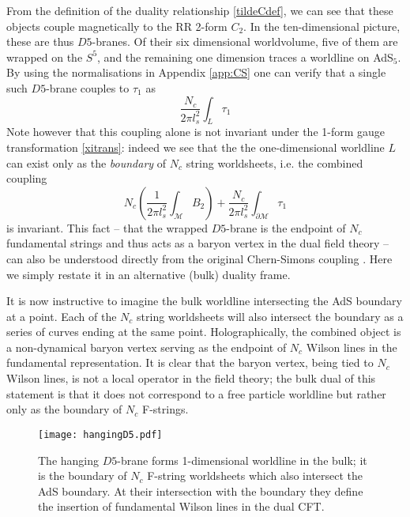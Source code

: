 \documentclass[aps,preprint,nofootinbib,preprintnumbers,eqsecnum,superscriptaddress]{revtex4}
\newcommand\p{\ensuremath{\partial}}
\def\le{\left}
\def\ri{\right}
\newcommand\sM{{\ensuremath{{\mathcal M}}}}
\begin{document}
From the definition of the duality relationship \eqref{tildeCdef}, we can see that these objects couple magnetically to the RR 2-form $C_2$. In the ten-dimensional picture, these are thus $D5$-branes. Of their six dimensional worldvolume, five of them are wrapped on the $S^5$, and the remaining one dimension traces a worldline on AdS$_5$. By using the normalisations in Appendix \ref{app:CS} one can verify that a single such $D5$-brane couples to $\tau_1$ as
\begin{equation}
\frac{N_c}{2\pi l_s^2} \int_{L} \tau_1
\end{equation}
Note however that this coupling alone is not invariant under the 1-form gauge transformation \eqref{xitrans}: indeed we see that the the one-dimensional worldline $L$ can exist only as the {\it boundary} of $N_c$ string worldsheets, i.e. the combined coupling
\begin{equation}
N_c \le(\frac{1}{2\pi l_{s}^2} \int_{\sM} B_2 \ri) + \frac{N_c}{2\pi l_s^2} \int_{\p\sM} \tau_1
\end{equation} 
is invariant. This fact -- that the wrapped $D5$-brane is the endpoint of $N_c$ fundamental strings and thus acts as a baryon vertex in the dual field theory -- can also be understood directly from the original Chern-Simons coupling \cite{Witten:1998xy,Aharony:1998qu,Maldacena:2001ss,Witten:1998wy}. Here we simply restate it in an alternative (bulk) duality frame. 

It is now instructive to imagine the bulk worldline intersecting the AdS boundary at a point.  Each of the $N_c$ string worldsheets will also intersect the boundary as a series of curves ending at the same point. Holographically, the combined object is a non-dynamical baryon vertex serving as the endpoint of $N_c$ Wilson lines in the fundamental representation. It is clear that the baryon vertex, being tied to $N_c$ Wilson lines, is not a local operator in the field theory; the bulk dual of this statement is that it does not correspond to a free particle worldline but rather only as the boundary of $N_c$ F-strings. 
\begin{figure}[h!]
\begin{center}
\texttt{[image: hangingD5.pdf]}
\caption{\label{fig:hangingD5}
The hanging $D5$-brane forms 1-dimensional worldline in the bulk; it is the boundary of $N_c$ F-string worldsheets which also intersect the AdS boundary. At their intersection with the boundary they define the insertion of fundamental Wilson lines in the dual CFT.}
\end{center}
\end{figure}
\end{document}
